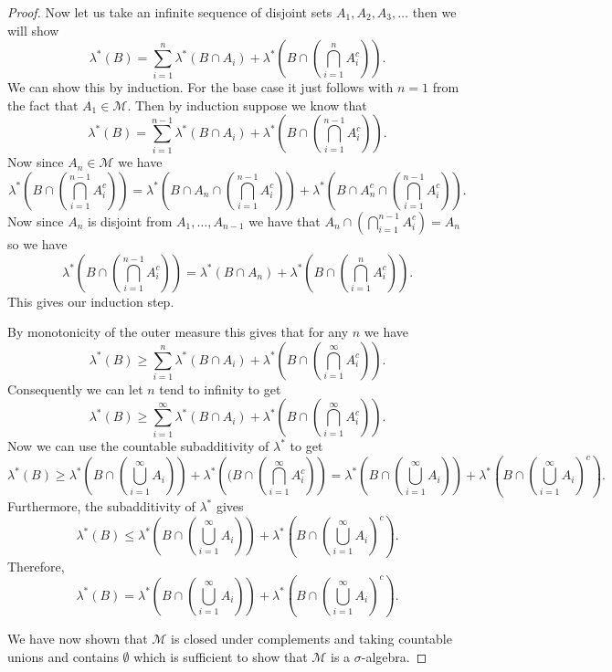 \documentclass[11pt]{article}
\theoremstyle{definition}
\theoremstyle{remark}
\begin{document}
\begin{proof}
Now let us take an infinite sequence of disjoint sets $A_1, A_2, A_3, \dots$ then we will show 
\[ \lambda^*(B) = \sum_{i=1}^n \lambda^* (B \cap A_i) + \lambda^*\left( B \cap \left( \bigcap_{i=1}^n A_i^c \right) \right). \] We can show this by induction. For the base case it just follows with $n=1$ from the fact that $A_1 \in \mathscr{M}$. Then by induction suppose we know that
\[ \lambda^*(B) = \sum_{i=1}^{n-1} \lambda^*(B \cap A_i) + \lambda^*\left( B \cap \left( \bigcap_{i=1}^{n-1} A_i^c \right) \right).  \] Now since $A_n \in \mathscr{M}$ we have
\[ \lambda^*\left( B \cap \left( \bigcap_{i=1}^{n-1} A_i^c \right) \right) = \lambda^* \left(B \cap A_n \cap \left( \bigcap_{i=1}^{n-1} A_i^c \right)  \right) + \lambda^* \left( B \cap A_n^c \cap \left( \bigcap_{i=1}^{n-1} A_i^c \right) \right).\] Now since $A_n$ is disjoint from $A_1, \dots, A_{n-1}$ we have that $A_n \cap \left( \bigcap_{i=1}^{n-1} A_i^c \right)  = A_n$ so we have \[  \lambda^*\left( B \cap \left( \bigcap_{i=1}^{n-1} A_i^c \right) \right) = \lambda^*(B \cap A_n) + \lambda^*\left( B \cap \left( \bigcap_{i=1}^{n} A_i^c \right) \right). \] This gives our induction step. 

By monotonicity of the outer measure this gives that for any $n$ we have
\[ \lambda^*(B) \geq \sum_{i=1}^n \lambda^*(B \cap A_i) + \lambda^* \left(B \cap \left( \bigcap_{i=1}^\infty A_i^c \right) \right). \] Consequently we can let $n$ tend to infinity to get
\[ \lambda^*(B) \geq \sum_{i=1}^\infty \lambda^*(B \cap A_i) +\lambda^* \left(B \cap \left( \bigcap_{i=1}^\infty A_i^c \right) \right). \] Now we can use the countable subadditivity of $\lambda^*$ to get
\[ \lambda^*(B) \geq \lambda^*\left( B \cap \left( \bigcup_{i=1}^\infty A_i \right)\right) + \lambda^*\left((B \cap \left( \bigcap_{i=1}^\infty A_i^c \right) \right) = \lambda^* \left( B \cap \left( \bigcup_{i=1}^\infty A_i \right) \right) + \lambda^* \left( B \cap \left( \bigcup_{i=1}^\infty A_i \right)^c \right).\] Furthermore, the subadditivity of $\lambda^*$ gives
\[ \lambda^*(B) \leq  \lambda^* \left( B \cap \left( \bigcup_{i=1}^\infty A_i \right) \right) + \lambda^* \left( B \cap \left( \bigcup_{i=1}^\infty A_i \right)^c \right). \] Therefore, 
\[ \lambda^*(B) =  \lambda^* \left( B \cap \left( \bigcup_{i=1}^\infty A_i \right) \right) + \lambda^* \left( B \cap \left( \bigcup_{i=1}^\infty A_i \right)^c \right). \]

We have now shown that $\mathscr{M}$ is closed under complements and taking countable unions and contains $\emptyset$ which is sufficient to show that $\mathscr{M}$ is a $\sigma$-algebra.
\end{proof}
\end{document}
